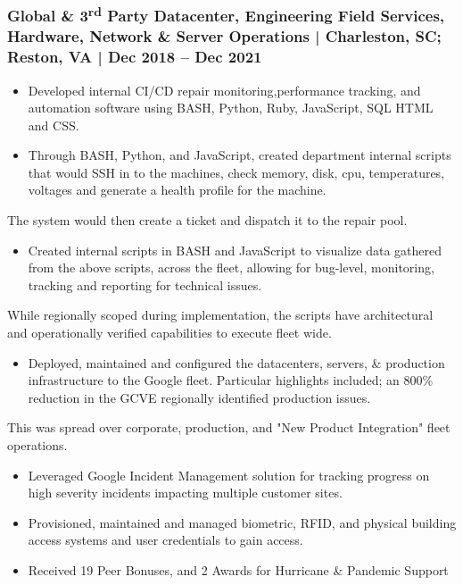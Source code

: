 \documentclass[letter,10pt]{article}
\begin{document}
\subsubsection*{Global \& 3\textsuperscript{rd} Party Datacenter, Engineering Field Services, Hardware, Network \& Server Operations | Charleston, SC; Reston, VA | Dec 2018 – Dec 2021}
\label{sec:orgf8638d0}
\begin{itemize}
\item Developed internal CI/CD repair monitoring,performance tracking, and automation software using BASH, Python, Ruby, JavaScript, SQL HTML and CSS.
\item Through BASH, Python, and JavaScript, created department internal scripts that would SSH in to the machines, check memory, disk, cpu, temperatures, voltages and generate a health profile for the machine.
\end{itemize}
The system would then create a ticket and dispatch it to the repair pool.
\begin{itemize}
\item Created internal scripts in BASH and JavaScript to visualize data gathered from the above scripts, across the fleet, allowing for bug-level, monitoring, tracking and reporting for technical issues.
\end{itemize}
While regionally scoped during implementation, the scripts have architectural and operationally verified capabilities to execute fleet wide. 
\begin{itemize}
\item Deployed, maintained and configured the datacenters, servers, \& production infrastructure to the Google fleet. Particular highlights included; an 800\% reduction in the GCVE regionally identified production issues.
\end{itemize}
This was spread over corporate, production, and "New Product Integration" fleet operations. 
\begin{itemize}
\item Leveraged Google Incident Management solution for tracking progress on high severity incidents impacting multiple customer sites.
\item Provisioned, maintained and managed biometric, RFID, and physical building access systems and user credentials to gain access.
\item Received 19 Peer Bonuses, and 2 Awards for Hurricane \& Pandemic Support
\end{itemize}
\end{document}
